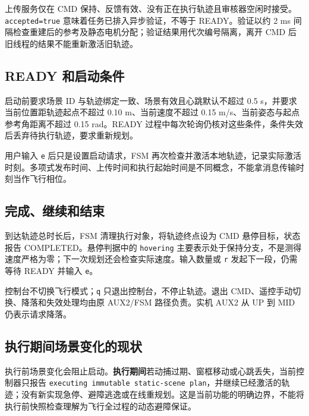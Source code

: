 \documentclass[UTF8,fontset=fandol,a4paper,10pt]{ctexart}
\newcommand{\code}[1]{{\small\nolinkurl{#1}}}
\begin{document}
上传服务仅在 CMD 保持、反馈有效、没有正在执行轨迹且审核器空闲时接受。\code{accepted=true} 意味着任务已排入异步验证，不等于 READY。验证以约 2 ms 间隔检查重建后的参考及静态电机分配；验证结果用代次编号隔离，离开 CMD 后旧线程的结果不能重新激活旧轨迹。

\subsection{READY 和启动条件}
启动前要求场景 ID 与轨迹绑定一致、场景有效且心跳默认不超过 0.5 s，并要求当前位置距轨迹起点不超过 0.10 m、当前速度不超过 0.15 m/s、当前姿态与起点参考角距离不超过 0.15 rad。READY 过程中每次轮询仍核对这些条件，条件失效后丢弃待执行轨迹，要求重新规划。

用户输入 \code{e} 后只是设置启动请求，FSM 再次检查并激活本地轨迹，记录实际激活时刻。多项式发布时间、上传时间和执行起始时间是不同概念，不能拿消息传输时刻当作飞行相位。

\subsection{完成、继续和结束}
到达轨迹总时长后，FSM 清理执行对象，将轨迹终点设为 CMD 悬停目标，状态报告 COMPLETED。悬停判据中的 \code{hovering} 主要表示处于保持分支，不是测得速度严格为零；下一次规划还会检查实际速度。输入数量或 \code{r} 发起下一段，仍需等待 READY 并输入 \code{e}。

控制台不切换飞行模式；\code{q} 只退出控制台，不停止轨迹。退出 CMD、遥控手动切换、降落和失效处理均由原 AUX2/FSM 路径负责。实机 AUX2 从 UP 到 MID 仍表示请求降落。

\subsection{执行期间场景变化的现状}
执行前场景变化会阻止启动。\textbf{执行期间}若动捕过期、窗框移动或心跳丢失，当前控制器只报告
\code{executing immutable static-scene plan}，并继续已经激活的轨迹；没有新实现急停、避障逃逸或在线重规划。这是当前功能的明确边界，不能将执行前快照检查理解为飞行全过程的动态避障保证。
\end{document}
